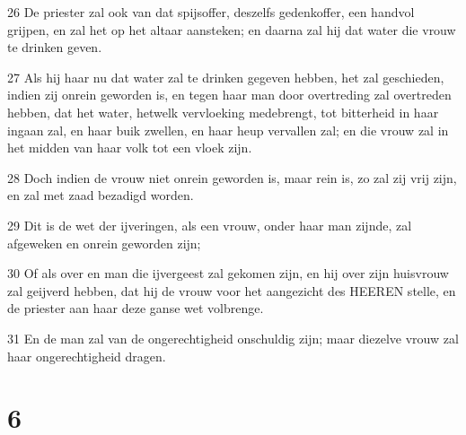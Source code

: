 \par 26 De priester zal ook van dat spijsoffer, deszelfs gedenkoffer, een handvol grijpen, en zal het op het altaar aansteken; en daarna zal hij dat water die vrouw te drinken geven.
\par 27 Als hij haar nu dat water zal te drinken gegeven hebben, het zal geschieden, indien zij onrein geworden is, en tegen haar man door overtreding zal overtreden hebben, dat het water, hetwelk vervloeking medebrengt, tot bitterheid in haar ingaan zal, en haar buik zwellen, en haar heup vervallen zal; en die vrouw zal in het midden van haar volk tot een vloek zijn.
\par 28 Doch indien de vrouw niet onrein geworden is, maar rein is, zo zal zij vrij zijn, en zal met zaad bezadigd worden.
\par 29 Dit is de wet der ijveringen, als een vrouw, onder haar man zijnde, zal afgeweken en onrein geworden zijn;
\par 30 Of als over en man die ijvergeest zal gekomen zijn, en hij over zijn huisvrouw zal geijverd hebben, dat hij de vrouw voor het aangezicht des HEEREN stelle, en de priester aan haar deze ganse wet volbrenge.
\par 31 En de man zal van de ongerechtigheid onschuldig zijn; maar diezelve vrouw zal haar ongerechtigheid dragen.

\chapter{6}


